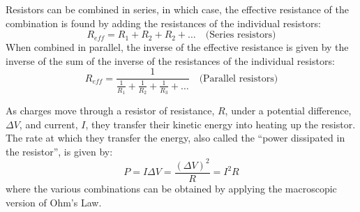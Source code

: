 Resistors can be combined in series, in which case, the effective resistance of the combination is found by adding the resistances of the individual resistors:
\begin{equation}
R_{eff}=R_1+R_2+R_2+\dots\quad\text{(Series resistors)}
\end{equation}
When combined in parallel, the inverse of the effective resistance is given by the inverse of the sum of the inverse of the resistances of the individual resistors:
\begin{equation}
R_{eff}=\frac{1}{\frac{1}{R_1}+\frac{1}{R_2}+\frac{1}{R_3}+\dots}\quad\text{(Parallel resistors)}
\end{equation}

As charges move through a resistor of resistance, $R$, under a potential difference, $\Delta V$, and current, $I$, they transfer their kinetic energy into heating up the resistor. The rate at which they transfer the energy, also called the ``power dissipated in the resistor'', is given by:
\begin{equation}
P=I \Delta V=\frac{(\Delta V)^2}{R}=I^2R
\end{equation}
where the various combinations can be obtained by applying the macroscopic version of Ohm's Law.

